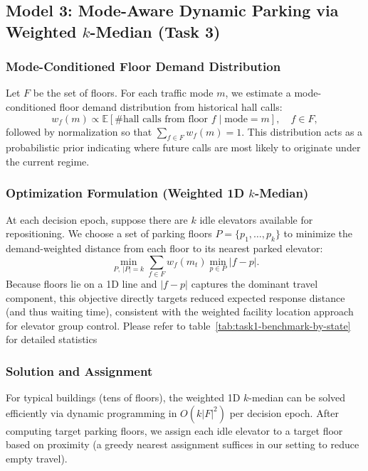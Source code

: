\subsection{Model 3: Mode-Aware Dynamic Parking via Weighted $k$-Median (Task 3)}

\subsubsection{Mode-Conditioned Floor Demand Distribution}
Let $F$ be the set of floors. For each traffic mode $m$, we estimate a mode-conditioned floor demand distribution from historical hall calls:
\begin{equation}
w_f(m) \propto \mathbb{E}[\text{\# hall calls from floor } f \mid \text{mode}=m], \quad f \in F,
\end{equation}
followed by normalization so that $\sum_{f \in F} w_f(m)=1$. This distribution acts as a probabilistic prior indicating where future calls are most likely to originate under the current regime.

\subsubsection{Optimization Formulation (Weighted 1D $k$-Median)}
At each decision epoch, suppose there are $k$ idle elevators available for repositioning. We choose a set of parking floors $P=\{p_1,\dots,p_k\}$ to minimize the demand-weighted distance from each floor to its nearest parked elevator:
\begin{equation}
\min_{P,\ |P|=k} \sum_{f \in F} w_f(m_t) \min_{p \in P} |f-p|.
\label{eq:kmedian}
\end{equation}
Because floors lie on a 1D line and $|f-p|$ captures the dominant travel component, this objective directly targets reduced expected response distance (and thus waiting time), consistent with the weighted facility location approach for elevator group control\cite{hakimi1964median}. Please refer to table~\ref{tab:task1-benchmark-by-state} for detailed statistics

\subsubsection{Solution and Assignment}
For typical buildings (tens of floors), the weighted 1D $k$-median can be solved efficiently via dynamic programming in $O(k|F|^2)$ per decision epoch. After computing target parking floors, we assign each idle elevator to a target floor based on proximity (a greedy nearest assignment suffices in our setting to reduce empty travel).

